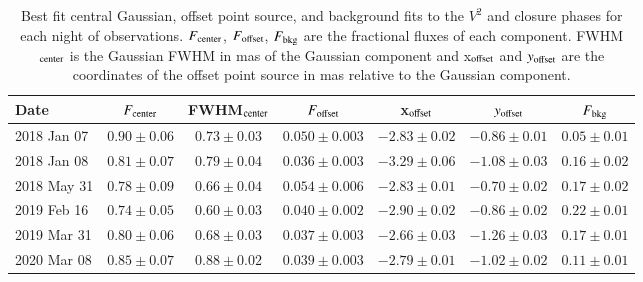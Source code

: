 \begin{table*}
\centering
\renewcommand{\arraystretch}{1.5}
\begin{tabular}{l | c c c c c c}
\hline\hline
Date        & $F_{\rm center}$ & FWHM$_{\rm center}$ & $F_{\rm offset}$  & x$_{\rm offset}$ & $y_{\rm offset}$ & $F_{\rm bkg}$ \\ 
\hline
2018 Jan 07 & $0.90 \pm 0.06$ & $0.73 \pm 0.03$      & $0.050 \pm 0.003$ & $-2.83 \pm 0.02$ & $-0.86 \pm 0.01$ & $0.05 \pm 0.01$ \\
2018 Jan 08 & $0.81 \pm 0.07$ & $0.79 \pm 0.04$      & $0.036 \pm 0.003$ & $-3.29 \pm 0.06$ & $-1.08 \pm 0.03$ & $0.16  \pm 0.02$  \\
2018 May 31 & $0.78 \pm 0.09$ & $0.66 \pm 0.04$      & $0.054 \pm 0.006$ & $-2.83 \pm 0.01$ & $-0.70 \pm 0.02$ & $0.17 \pm 0.02$ \\
2019 Feb 16 & $0.74 \pm 0.05$ & $0.60 \pm 0.03$      & $0.040 \pm 0.002$ & $-2.90 \pm 0.02$ & $-0.86 \pm 0.02$ & $0.22 \pm 0.01$ \\
2019 Mar 31 & $0.80 \pm 0.06$ & $0.68 \pm 0.03$      & $0.037 \pm 0.003$ & $-2.66 \pm 0.03$ & $-1.26 \pm 0.03$ & $0.17 \pm 0.01$ \\
2020 Mar 08 & $0.85 \pm 0.07$ & $0.88 \pm 0.02$      & $0.039 \pm 0.003$ & $-2.79 \pm 0.01$ & $-1.02 \pm 0.02$ & $0.11 \pm 0.01$ \\
\hline\hline
\end{tabular}
\caption{Best fit central Gaussian, offset point source, and background fits to the $V^2$ and closure phases for each night of observations. 
         $F_{\rm center}$, $F_{\rm offset}$, $F_{\rm bkg}$ are the fractional fluxes of each component. 
         FWHM$_{\rm center}$ is the Gaussian FWHM in mas of the Gaussian component and x$_{\rm offset}$ and $y_{\rm offset}$ are 
         the coordinates of the offset point source in mas relative to the Gaussian component. 
}
\label{tab:model_fits}
\end{table*}